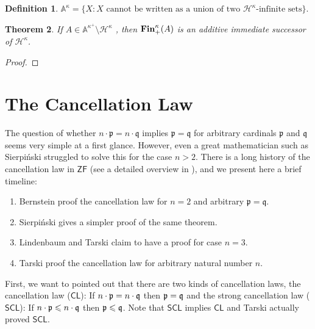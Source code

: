 \documentclass{amsart}
\newcommand{\CL}{\ensuremath{\mathsf{CL}}}
\newcommand{\SCL}{\ensuremath{\mathsf{SCL}}}
\newcommand{\Fin}{\textbf{\textup{Fin}}}
\renewcommand{\leq}{\leqslant}
\newcommand{\1}{\ensuremath{\mathds{1}}}
\theoremstyle{plain}
\newtheorem{thm}{Theorem}[section]
\theoremstyle{boldrk}
\theoremstyle{definition}
\newtheorem{defn}[thm]{Definition}
\begin{document}
\begin{defn}
 $\mathbb{A}^{\kappa}=\{X: X\text{ cannot be written as a union of two $\mathcal{H}^{\kappa}$-infinite sets}\}.$  
\end{defn}

\begin{thm}
 If $A\in\mathbb{A}^{\kappa^{+}}\setminus\mathcal{H}^{\kappa}$ , then $\Fin^{\kappa}_{+}(A)$ is an additive immediate successor of $\mathcal{H}^{\kappa}$.  
\end{thm}

\begin{proof}
    
\end{proof}







\appendix
\section{The Cancellation Law}

\noindent The question of whether \( n \cdot \mathfrak{p} = n \cdot \mathfrak{q} \) implies \( \mathfrak{p} = \mathfrak{q} \) for arbitrary cardinals \(\mathfrak{p}\) and \(\mathfrak{q}\) seems very simple at a first glance. However, even a great mathematician such as Sierpiński struggled to solve this for the case \( n > 2 \). There is a long history of the cancellation law in \(\mathsf{ZF}\) (see a detailed overview in \cite{HK}), and we present here a brief timeline:

\begin{enumerate}
    \item[1905] Bernstein proof the cancellation law for $n=2$ and arbitrary \( \mathfrak{p} = \mathfrak{q} \).
    \item[1922] Sierpiński gives a simpler proof of the same theorem.
    \item[1926] Lindenbaum and Tarski claim to have a proof for case $n=3$.
    \item[1949] Tarski proof the cancellation law for arbitrary natural number $n$.
\end{enumerate}

\noindent First, we want to pointed out that there are two kinds of cancellation laws, the
cancellation law ($\CL$): If $n\cdot\frak{p}= n \cdot \mathfrak{q}$ then $\frak{p}=\frak{q}$ and
the strong cancellation law ($\SCL$): If $n\cdot\frak{p}\leq n \cdot \mathfrak{q}$ then $\frak{p}\leq\frak{q}$. Note that $\SCL$ implies $\CL$ and Tarski actually proved $\SCL$.
\end{document}
